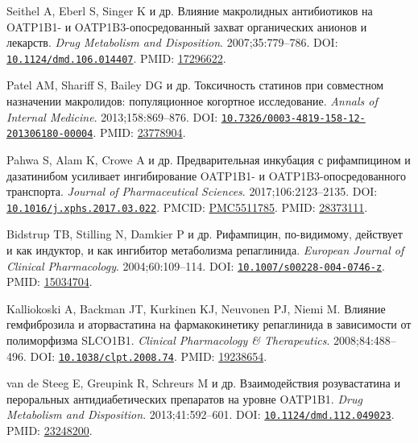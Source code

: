 \documentclass[11pt]{article}
\begin{document}
\begin{description}[before={\microtypesetup{expansion=false}\setlength{\RaggedRightRightskip}{0pt plus 4em}\RaggedRight}]
\item[{[62]}] Seithel A, Eberl S, Singer K и др. Влияние макролидных антибиотиков на OATP1B1- и OATP1B3-опосредованный захват органических анионов и лекарств. \textit{\foreignlanguage{english}{Drug Metabolism and Disposition}}. 2007;35:779--786. DOI: \href{https://doi.org/10.1124/dmd.106.014407}{\nolinkurl{10.1124/dmd.106.014407}}. PMID: \href{https://pubmed.ncbi.nlm.nih.gov/17296622/}{17296622}.
\item[{[63]}] Patel AM, Shariff S, Bailey DG и др. Токсичность статинов при совместном назначении макролидов: популяционное когортное исследование. \textit{\foreignlanguage{english}{Annals of Internal Medicine}}. 2013;158:869--876. DOI: \href{https://doi.org/10.7326/0003-4819-158-12-201306180-00004}{\nolinkurl{10.7326/0003-4819-158-12-201306180-00004}}. PMID: \href{https://pubmed.ncbi.nlm.nih.gov/23778904/}{23778904}.
\item[{[64]}] Pahwa S, Alam K, Crowe A и др. Предварительная инкубация с рифампицином и дазатинибом усиливает ингибирование OATP1B1- и OATP1B3-опосредованного транспорта. \textit{\foreignlanguage{english}{Journal of Pharmaceutical Sciences}}. 2017;106:2123--2135. DOI: \href{https://doi.org/10.1016/j.xphs.2017.03.022}{\nolinkurl{10.1016/j.xphs.2017.03.022}}. PMCID: \href{https://pmc.ncbi.nlm.nih.gov/articles/PMC5511785/}{PMC5511785}. PMID: \href{https://pubmed.ncbi.nlm.nih.gov/28373111/}{28373111}.
\item[{[65]}] Bidstrup TB, Stilling N, Damkier P и др. Рифампицин, по-видимому, действует и как индуктор, и как ингибитор метаболизма репаглинида. \textit{\foreignlanguage{english}{European Journal of Clinical Pharmacology}}. 2004;60:109--114. DOI: \href{https://doi.org/10.1007/s00228-004-0746-z}{\nolinkurl{10.1007/s00228-004-0746-z}}. PMID: \href{https://pubmed.ncbi.nlm.nih.gov/15034704/}{15034704}.
\item[{[66]}] Kalliokoski A, Backman JT, Kurkinen KJ, Neuvonen PJ, Niemi M. Влияние гемфиброзила и аторвастатина на фармакокинетику репаглинида в зависимости от полиморфизма SLCO1B1. \textit{\foreignlanguage{english}{Clinical Pharmacology \& Therapeutics}}. 2008;84:488--496. DOI: \href{https://doi.org/10.1038/clpt.2008.74}{\nolinkurl{10.1038/clpt.2008.74}}. PMID: \href{https://pubmed.ncbi.nlm.nih.gov/19238654/}{19238654}.
\item[{[67]}] van de Steeg E, Greupink R, Schreurs M и др. Взаимодействия розувастатина и пероральных антидиабетических препаратов на уровне OATP1B1. \textit{\foreignlanguage{english}{Drug Metabolism and Disposition}}. 2013;41:592--601. DOI: \href{https://doi.org/10.1124/dmd.112.049023}{\nolinkurl{10.1124/dmd.112.049023}}. PMID: \href{https://pubmed.ncbi.nlm.nih.gov/23248200/}{23248200}.

\end{description}
\end{document}
